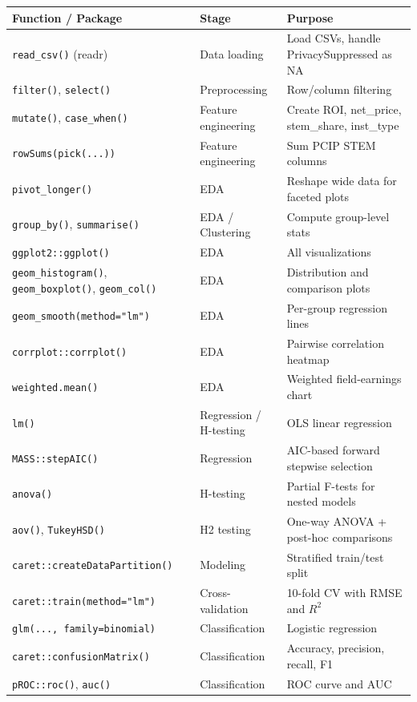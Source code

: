 \documentclass[12pt, letterpaper]{article}
\begin{document}
\begin{longtable}{p{4.5cm} p{4cm} p{6cm}}
\toprule
\textbf{Function / Package} & \textbf{Stage} & \textbf{Purpose} \\
\midrule
\endhead
\texttt{read\_csv()} (readr) & Data loading & Load CSVs, handle PrivacySuppressed as NA \\
\texttt{filter()}, \texttt{select()} & Preprocessing & Row/column filtering \\
\texttt{mutate()}, \texttt{case\_when()} & Feature engineering & Create ROI, net\_price, stem\_share, inst\_type \\
\texttt{rowSums(pick(...))} & Feature engineering & Sum PCIP STEM columns \\
\texttt{pivot\_longer()} & EDA & Reshape wide data for faceted plots \\
\texttt{group\_by()}, \texttt{summarise()} & EDA / Clustering & Compute group-level stats \\
\texttt{ggplot2::ggplot()} & EDA & All visualizations \\
\texttt{geom\_histogram()}, \texttt{geom\_boxplot()}, \texttt{geom\_col()} & EDA & Distribution and comparison plots \\
\texttt{geom\_smooth(method="lm")} & EDA & Per-group regression lines \\
\texttt{corrplot::corrplot()} & EDA & Pairwise correlation heatmap \\
\texttt{weighted.mean()} & EDA & Weighted field-earnings chart \\
\texttt{lm()} & Regression / H-testing & OLS linear regression \\
\texttt{MASS::stepAIC()} & Regression & AIC-based forward stepwise selection \\
\texttt{anova()} & H-testing & Partial F-tests for nested models \\
\texttt{aov()}, \texttt{TukeyHSD()} & H2 testing & One-way ANOVA + post-hoc comparisons \\
\texttt{caret::createDataPartition()} & Modeling & Stratified train/test split \\
\texttt{caret::train(method="lm")} & Cross-validation & 10-fold CV with RMSE and $R^2$ \\
\texttt{glm(..., family=binomial)} & Classification & Logistic regression \\
\texttt{caret::confusionMatrix()} & Classification & Accuracy, precision, recall, F1 \\
\texttt{pROC::roc()}, \texttt{auc()} & Classification & ROC curve and AUC \\

\end{longtable}
\end{document}
